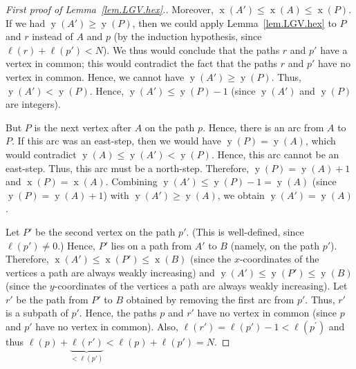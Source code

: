 \documentclass[reqno]{amsart}
\newcommand{\0}{\phantom{c}}
\DeclareMathOperator{\xcoord}{x} %
\DeclareMathOperator{\ycoord}{y} %
\newenvironment{verlong}{}{}
\theoremstyle{plain}
\theoremstyle{definition}
\numberwithin{equation}{section}
\begin{document}
\begin{verlong}
\begin{proof}[First proof of Lemma~\ref{lem.LGV.hex}.]
Moreover, $\xcoord\left(  A'\right)  \leq\xcoord%
\left(  A\right)  \leq\xcoord\left(  P\right)  $. If we had
$\ycoord\left(  A'\right)  \geq\ycoord\left(
P\right)  $, then we could apply Lemma~\ref{lem.LGV.hex} to $P$ and $r$
instead of $A$ and $p$ (by the induction hypothesis, since $\ell\left(
r\right)  +\ell\left(  p'\right)  <N$). We thus would conclude that
the paths $r$ and $p'$ have a vertex in common; this would contradict
the fact that the paths $r$ and $p'$ have no vertex in common. Hence,
we cannot have $\ycoord\left(  A'\right)  \geq
\ycoord\left(  P\right)  $. Thus, $\ycoord\left(
A'\right)  <\ycoord\left(  P\right)  $. Hence,
$\ycoord\left(  A'\right)  \leq\ycoord\left(
P\right)  -1$ (since $\ycoord\left(  A'\right)  $ and
$\ycoord\left(  P\right)  $ are integers).

But $P$ is the next vertex after $A$ on the path $p$. Hence, there is an arc
from $A$ to $P$. If this arc was an east-step, then we would have
$\ycoord\left(  P\right)  =\ycoord\left(  A\right)  $,
which would contradict $\ycoord\left(  A\right)  \leq
\ycoord\left(  A'\right)  <\ycoord\left(
P\right)  $. Hence, this arc cannot be an east-step. Thus, this arc must be a
north-step. Therefore, $\ycoord\left(  P\right)  =\ycoord%
\left(  A\right)  +1$ and $\xcoord\left(  P\right)
=\xcoord\left(  A\right)  $. Combining $\ycoord\left(
A'\right)  \leq\ycoord\left(  P\right)  -1=\ycoord%
\left(  A\right)  $ (since $\ycoord\left(  P\right)
=\ycoord\left(  A\right)  +1$) with $\ycoord\left(
A'\right)  \geq\ycoord\left(  A\right)  $, we obtain
$\ycoord\left(  A'\right)  =\ycoord\left(
A\right)  $.

Let $P'$ be the second vertex on the path $p'$. (This is
well-defined, since $\ell\left(  p'\right)  \neq0$.) Hence,
$P'$ lies on a path from $A'$ to $B$ (namely, on the path
$p'$). Therefore, $\xcoord\left(  A'\right)
\leq\xcoord\left(  P'\right)  \leq\xcoord\left(
B\right)  $ (since the $x$-coordinates of the vertices a path are always weakly
increasing) and $\ycoord\left(  A'\right)  \leq
\ycoord\left(  P'\right)  \leq\ycoord\left(
B\right)  $ (since the $y$-coordinates of the vertices a path are always weakly
increasing). Let $r'$ be the path from $P'$ to $B$ obtained by
removing the first arc from $p'$. Thus, $r'$ is a subpath of
$p'$. Hence, the paths $p$ and $r'$ have no vertex in common
(since $p$ and $p'$ have no vertex in common). Also, $\ell\left(
r'\right)  =\ell\left(  p'\right)  -1<\ell\left(  p^{\prime
}\right)  $ and thus $\ell\left(  p\right)  +\underbrace{\ell\left(
r'\right)  }_{<\ell\left(  p'\right)  }<\ell\left(  p\right)
+\ell\left(  p'\right)  =N$.


\end{proof}
\end{verlong}
\end{document}
